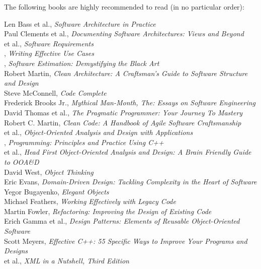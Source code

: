 \documentclass[nobrand,anonymous,nodate,nosecurity]{huawei}
\begin{document}
The following books are highly recommended to read (in no particular order):

\begin{multicols}{2}\small\raggedright
Len Bass et al., \emph{Software Architecture in Practice}\\
Paul Clements et al., \emph{Documenting Software Architectures: Views and Beyond}\\
 et al., \emph{Software Requirements}\\
{}, \emph{Writing Effective Use Cases}\\
{}, \emph{Software Estimation: Demystifying the Black Art}\\
{Robert Martin}, \emph{Clean Architecture: A Craftsman's Guide to Software Structure and Design}\\
{Steve McConnell}, \emph{Code Complete}\\
{Frederick Brooks Jr.}, \emph{Mythical Man-Month, The: Essays on Software Engineering}\\
{David Thomas et al.}, \emph{The Pragmatic Programmer: Your Journey To Mastery}\\
{Robert C. Martin}, \emph{Clean Code: A Handbook of Agile Software Craftsmanship}\\
{ et al.}, \emph{Object-Oriented Analysis and Design with Applications}\\
{}, \emph{Programming: Principles and Practice Using C++}\\
{ et al.}, \emph{Head First Object-Oriented Analysis and Design: A Brain Friendly Guide to OOA\&D}\\
{David West}, \emph{Object Thinking}\\
{Eric Evans}, \emph{Domain-Driven Design: Tackling Complexity in the Heart of Software}\\
{Yegor Bugayenko}, \emph{Elegant Objects}\\
{Michael Feathers}, \emph{Working Effectively with Legacy Code}\\
{Martin Fowler}, \emph{Refactoring: Improving the Design of Existing Code}\\
{Erich Gamma et al.}, \emph{Design Patterns: Elements of Reusable Object-Oriented Software}\\
{Scott Meyers}, \emph{Effective C++: 55 Specific Ways to Improve Your Programs and Designs}\\
{ et al.}, \emph{XML in a Nutshell, Third Edition}\\

\end{multicols}
\end{document}
